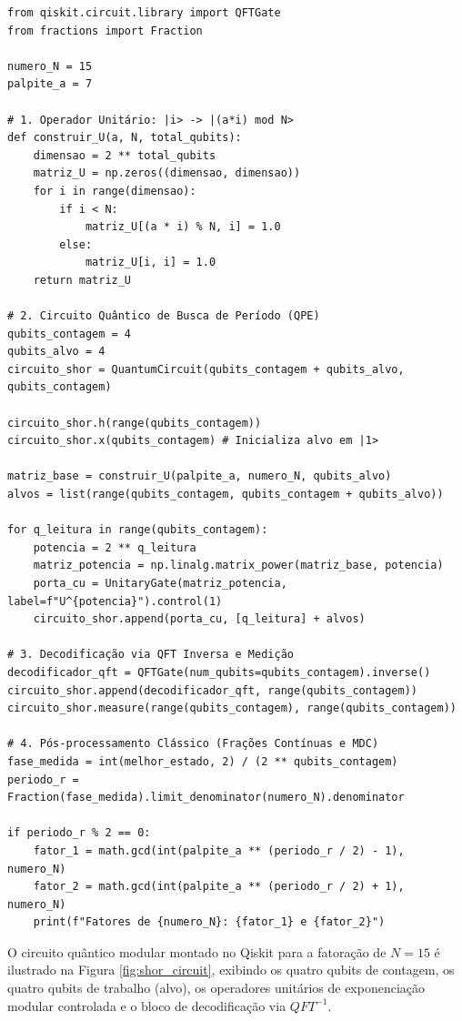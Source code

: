\documentclass[12pt, a4paper]{article}
\begin{document}
\begin{lstlisting}[caption={Implementação híbrida do Algoritmo de Shor fatorando o número 15.}]
from qiskit.circuit.library import QFTGate
from fractions import Fraction

numero_N = 15
palpite_a = 7

# 1. Operador Unitário: |i> -> |(a*i) mod N>
def construir_U(a, N, total_qubits):
    dimensao = 2 ** total_qubits
    matriz_U = np.zeros((dimensao, dimensao))
    for i in range(dimensao):
        if i < N:
            matriz_U[(a * i) % N, i] = 1.0
        else:
            matriz_U[i, i] = 1.0
    return matriz_U

# 2. Circuito Quântico de Busca de Período (QPE)
qubits_contagem = 4
qubits_alvo = 4
circuito_shor = QuantumCircuit(qubits_contagem + qubits_alvo, qubits_contagem)

circuito_shor.h(range(qubits_contagem))
circuito_shor.x(qubits_contagem) # Inicializa alvo em |1>

matriz_base = construir_U(palpite_a, numero_N, qubits_alvo)
alvos = list(range(qubits_contagem, qubits_contagem + qubits_alvo))

for q_leitura in range(qubits_contagem):
    potencia = 2 ** q_leitura
    matriz_potencia = np.linalg.matrix_power(matriz_base, potencia)
    porta_cu = UnitaryGate(matriz_potencia, label=f"U^{potencia}").control(1)
    circuito_shor.append(porta_cu, [q_leitura] + alvos)

# 3. Decodificação via QFT Inversa e Medição
decodificador_qft = QFTGate(num_qubits=qubits_contagem).inverse()
circuito_shor.append(decodificador_qft, range(qubits_contagem))
circuito_shor.measure(range(qubits_contagem), range(qubits_contagem))

# 4. Pós-processamento Clássico (Frações Contínuas e MDC)
fase_medida = int(melhor_estado, 2) / (2 ** qubits_contagem)
periodo_r = Fraction(fase_medida).limit_denominator(numero_N).denominator

if periodo_r % 2 == 0:
    fator_1 = math.gcd(int(palpite_a ** (periodo_r / 2) - 1), numero_N)
    fator_2 = math.gcd(int(palpite_a ** (periodo_r / 2) + 1), numero_N)
    print(f"Fatores de {numero_N}: {fator_1} e {fator_2}")
\end{lstlisting}

O circuito quântico modular montado no Qiskit para a fatoração de $N = 15$ é ilustrado na Figura \ref{fig:shor_circuit}, exibindo os quatro qubits de contagem, os quatro qubits de trabalho (alvo), os operadores unitários de exponenciação modular controlada e o bloco de decodificação via $QFT^{-1}$.
\end{document}
